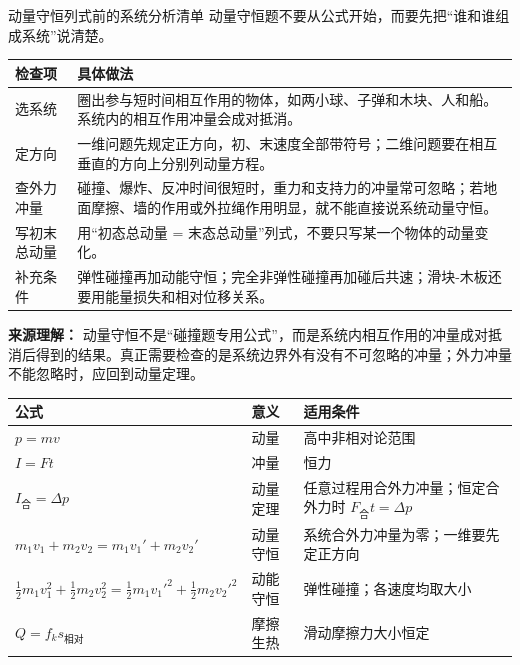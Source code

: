 \begin{learningbox}{动量守恒列式前的系统分析清单}
动量守恒题不要从公式开始，而要先把“谁和谁组成系统”说清楚。
\begin{center}
\begin{tabular}{p{}p{}}
\toprule
检查项 & 具体做法 \\
\midrule
选系统 & 圈出参与短时间相互作用的物体，如两小球、子弹和木块、人和船。系统内的相互作用冲量会成对抵消。 \\
定方向 & 一维问题先规定正方向，初、末速度全部带符号；二维问题要在相互垂直的方向上分别列动量方程。 \\
查外力冲量 & 碰撞、爆炸、反冲时间很短时，重力和支持力的冲量常可忽略；若地面摩擦、墙的作用或外拉绳作用明显，就不能直接说系统动量守恒。 \\
写初末总动量 & 用“初态总动量 = 末态总动量”列式，不要只写某一个物体的动量变化。 \\
补充条件 & 弹性碰撞再加动能守恒；完全非弹性碰撞再加碰后共速；滑块-木板还要用能量损失和相对位移关系。 \\
\bottomrule
\end{tabular}
\end{center}

\textbf{来源理解：} 动量守恒不是“碰撞题专用公式”，而是系统内相互作用的冲量成对抵消后得到的结果。真正需要检查的是系统边界外有没有不可忽略的冲量；外力冲量不能忽略时，应回到动量定理。
\end{learningbox}

\begin{center}
\begin{tabular}{p{}p{}p{}}
\toprule
公式 & 意义 & 适用条件 \\
\midrule
$p = mv$ & 动量 & 高中非相对论范围 \\
$I = Ft$ & 冲量 & 恒力 \\
$I_{\text{合}} = \Delta p$ & 动量定理 & 任意过程用合外力冲量；恒定合外力时 $F_{\text{合}}t=\Delta p$ \\
$m_1 v_1 + m_2 v_2 = m_1 v_1' + m_2 v_2'$ & 动量守恒 & 系统合外力冲量为零；一维要先定正方向 \\
$\frac12 m_1 v_1^2+\frac12 m_2 v_2^2=\frac12 m_1 v_1'^2+\frac12 m_2 v_2'^2$ & 动能守恒 & 弹性碰撞；各速度均取大小 \\
$Q=f_k s_{\text{相对}}$ & 摩擦生热 & 滑动摩擦力大小恒定 \\
\bottomrule
\end{tabular}
\end{center}

